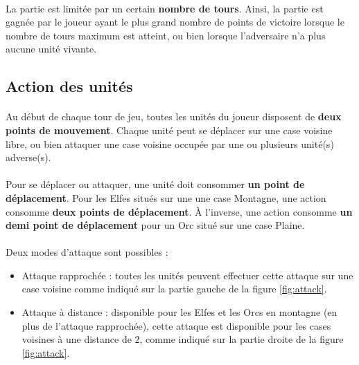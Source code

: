 \paragraph{}
La partie est limitée par un certain \textbf{nombre de tours}. Ainsi, la partie est gagnée par le joueur ayant le plus grand nombre de points de victoire lorsque le nombre de tours maximum est atteint, ou bien lorsque l'adversaire n'a plus aucune unité vivante.

\subsection{Action des unités}

\paragraph{}
Au début de chaque tour de jeu, toutes les unités du joueur disposent de \textbf{deux points de mouvement}. Chaque unité peut se déplacer sur une case voisine libre, ou bien attaquer une case voisine occupée par une ou plusieurs unité(s) adverse(s).

\paragraph{}
Pour se déplacer ou attaquer, une unité doit consommer \textbf{un point de déplacement}. Pour les Elfes situés sur une une case Montagne, une action consomme \textbf{deux points de déplacement}. À l'inverse, une action consomme \textbf{un demi point de déplacement} pour un Orc situé sur une case Plaine.

\paragraph{}
Deux modes d'attaque sont possibles :

\begin{itemize}
  \item Attaque rapprochée : toutes les unités peuvent effectuer cette attaque sur une case voisine comme indiqué sur la partie gauche de la figure \ref{fig:attack}.
  \item Attaque à distance : disponible pour les Elfes et les Orcs en montagne (en plus de l'attaque rapprochée), cette attaque est disponible pour les cases voisines à une distance de 2, comme indiqué sur la partie droite de la figure \ref{fig:attack}.
\end{itemize}

